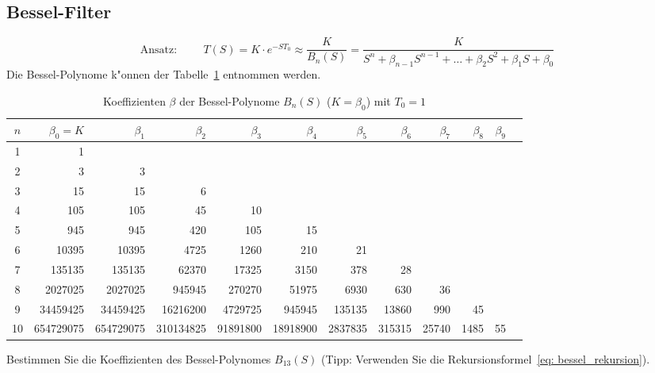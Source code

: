 \subsection{Bessel-Filter}
\[\mbox{Ansatz:} \hspace{1cm} T(S)=K \cdot e^{-ST_{0}} \approx \frac{K}{B_{n}(S)}=\frac{K}{S^{n}+\beta_{n-1}S^{n-1}+ \ldots + \beta_{2}S^{2}+\beta_{1}S+\beta_{0}} \]
Die Bessel-Polynome k"onnen der Tabelle~\ref{b-poly} entnommen werden.
\begin{table}[!htb]
\begin{center}{\scriptsize
\begin{tabular}{|c||r|r|r|r|r|r|r|r|r|r|r|}\hline
  $n$ & $\beta_0=K$ & $\beta_1$ & $\beta_2$ & $\beta_3$ & $\beta_4$ & $\beta_5$ & $\beta_6$ & $\beta_7$ & $\beta_8$ & $\beta_9$   \\ \hline\hline
   1  & 1     &       &       &       &       &      &   & &   &\\ \hline
   2  & 3     & 3     &       &       &       &      &   & &   &\\ \hline
   3  & 15    & 15    & 6     &       &       &      &   & &   &\\ \hline
   4  & 105   & 105   & 45    & 10    &       &      &   & &   &\\ \hline
   5  & 945   & 945   & 420   & 105   & 15    &      &   & &   &\\ \hline
   6  & 10395 & 10395 & 4725  & 1260  & 210   & 21   &   & &   &\\ \hline
   7  & 135135 & 135135 & 62370 & 17325 & 3150 & 378 & 28 & &   &\\ \hline
   8  & 2027025 & 2027025 & 945945 & 270270 & 51975 & 6930 & 630 & 36 & & \\ \hline
   9  & 34459425 & 34459425 & 16216200 & 4729725 & 945945 & 135135 & 13860 & 990 & 45 & \\ \hline
  10  & 654729075 & 654729075 & 310134825 & 91891800 & 18918900 & 2837835 & 315315 & 25740 & 1485 & 55 \\ \hline
\end{tabular}}
\end{center}\vspace*{-5mm}
\caption{Koeffizienten $\beta$ der Bessel-Polynome $B_n(S)$ ($K=\beta_0$) mit $T_0=1$}\label{b-poly}
\end{table}\vspace*{-5mm}
\aufg
Bestimmen Sie die Koeffizienten des Bessel-Polynomes $B_{13}(S)$ (Tipp: Verwenden Sie die Rekursionsformel~\ref{eq: bessel_rekursion}).\\
